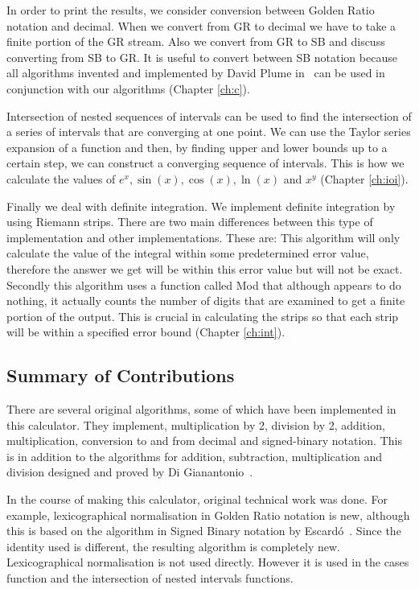 \documentclass{cs4rep}
\begin{document}
In order to print the results, we consider conversion between Golden
Ratio notation and decimal. When we convert from GR to decimal we have
to take a finite portion of the GR stream.  Also we convert from GR to
SB and discuss converting from SB to GR. It is useful to convert
between SB notation because all algorithms invented and
implemented by David Plume in~\cite{kn:Plume} can be used in conjunction with our algorithms (Chapter \ref{ch:c}).

Intersection of nested sequences of intervals can be used to find the
intersection of a series of intervals that are converging at one
point. We can use the Taylor series expansion of a function and then,
by finding upper and lower bounds up to a certain step, we can
construct a converging sequence of intervals. This is how we calculate
the values of $e^{x}, \sin(x), \cos(x), \ln(x)$ and $x^{y}$ (Chapter \ref{ch:ioi}).

Finally we deal with definite integration. We implement definite
integration by using Riemann strips. There are two main differences
between this type of implementation and other implementations. These
are: This algorithm will only calculate the value of the integral
within some predetermined error value, therefore the answer we get
will be within this error value but will not be exact. Secondly this
algorithm uses a function called Mod that although appears to do
nothing, it actually counts the number of digits that are examined to
get a finite portion of the output. This is crucial in calculating the
strips so that each strip will be within a specified error bound (Chapter \ref{ch:int}).


\subsection*{Summary of Contributions}

There are several original algorithms, some of which have been
implemented in this calculator. They implement, multiplication by 2,
division by 2, addition, multiplication, conversion to and from
decimal and signed-binary notation. This is in addition to the
algorithms for addition, subtraction, multiplication and division
designed and proved by Di Gianantonio~\cite{kn:DiGianantonio}.

In the course of making this calculator, original technical work was
done. For example, lexicographical normalisation in Golden Ratio
notation is new, although this is based on the algorithm in Signed
Binary notation by Escard\'o~\cite{kn:Escardo}. Since the identity used
is different, the resulting algorithm is completely new.
Lexicographical normalisation is not used directly. However it is used
in the cases function and the intersection of nested intervals
functions.
\end{document}
